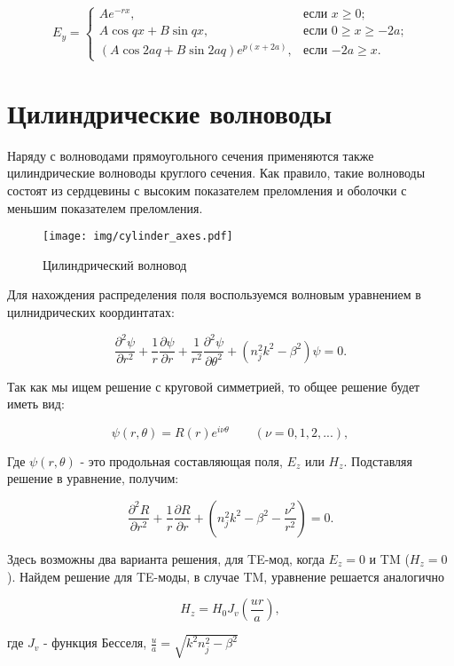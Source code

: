 \begin{equation}
	E_y =
	\begin{cases}
		Ae^{-rx}, &\text{если $x \geqslant 0$;}\\
		A\cos qx + B\sin qx, &\text{если $0 \geqslant x \geqslant -2a $;}\\
		(A\cos 2aq + B\sin 2aq)e^{p(x+2a)}, &\text{если $-2a \geqslant x$.}
	\end{cases}
\end{equation}

\section{Цилиндрические волноводы}
Наряду с волноводами прямоугольного сечения применяются также цилиндрические волноводы круглого сечения. Как правило, такие волноводы состоят из сердцевины с высоким показателем преломления и оболочки с меньшим показателем преломления. 

\begin{figure}[h!]
	\texttt{[image: img/cylinder\_axes.pdf]}
	\caption{Цилиндрический волновод}
\end{figure}

Для нахождения распределения поля воспользуемся волновым уравнением в цилнидрических координтатах:

\begin{equation}
	\frac{\partial^2\psi}{\partial r^2} + \frac{1}{r}\frac{\partial\psi}{\partial r}+\frac{1}{r^2}\frac{\partial^2\psi}{\partial\theta^2}+(n_j^2 k^2 - \beta^2)\psi = 0.
\end{equation}

Так как мы ищем решение с круговой симметрией, то общее решение будет иметь вид:

\begin{equation}
	\psi(r, \theta) = R(r)e^{i\nu\theta} \qquad (\nu = 0,1,2, ...),
\end{equation}

Где $\psi(r, \theta)$ - это продольная составляющая поля, $E_z$ или $H_z$. Подставляя решение в уравнение, получим:

\begin{equation}
	\frac{\partial^2 R}{\partial r^2} + \frac{1}{r}\frac{\partial R}{\partial r}+(n_j^2 k^2 - \beta^2 - \frac{\nu^2}{r^2}) = 0.
\end{equation}

Здесь возможны два варианта решения, для TE-мод, когда $E_z = 0$ и TM ($H_z = 0$). Найдем решение для TE-моды, в случае TM, уравнение решается аналогично

\begin{equation}
	H_z = H_0 J_v (\frac{ur}{a}),
\end{equation}

где $J_v$ - функция Бесселя, $\frac{u}{a} = \sqrt{k^2 n_j^2 - \beta^2}$